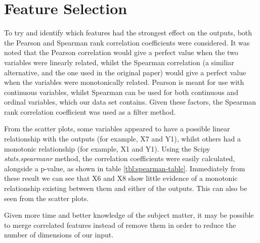 \documentclass[12pt]{article}
\begin{document}
\FloatBarrier

\part{Feature Selection}

To try and identify which features had the strongest effect on the outputs, both the Pearson and Spearman rank correlation coefficients were considered. It was noted that the Pearson correlation would give a perfect value when the two variables were linearly related, whilst the Spearman correlation (a similiar alternative, and the one used in the original paper) would give a perfect value when the variables were monotonically related. Pearson is meant for use with continuous variables, whilst Spearman can be used for both continuous and ordinal variables, which our data set contains. Given these factors, the Spearman rank correlation coefficient was used as a filter method.

From the scatter plots, some variables appeared to have a possible linear relationship with the outputs (for example, X7 and Y1), whilst others had a monotonic relationship (for example, X1 and Y1). Using the Scipy \emph{stats.spearmanr} method, the correlation coefficients were easily calculated, alongside a p-value, as shown in table \ref{tbl:spearman-table}. Immediately from these result we can see that X6 and X8 show little evidence of a monotonic relationship existing between them and either of the outputs. This can also be seen from the scatter plots.

Given more time and better knowledge of the subject matter, it may be possible to merge correlated features instead of remove them in order to reduce the number of dimensions of our input. 
\end{document}
